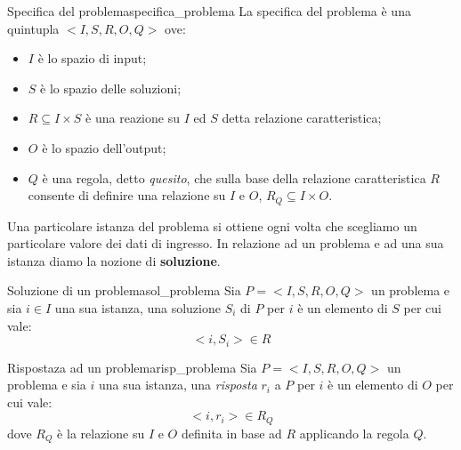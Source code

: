 \documentclass[12pt]{report}
\newcounter{definition}
\newcommand{\nmu}{}
\begin{document}
   	\begin{definition}{\nmu Specifica del problema}{specifica_problema}
   		La specifica del problema è una quintupla $<I, S, R, O, Q>$ ove:
   		\begin{itemize}
   			\item $I$ è lo spazio di input;
   			\item $S$ è lo spazio delle soluzioni;
   			\item $R \subseteq I \times S$ è una reazione su $I$ ed $S$ detta relazione caratteristica;
   			\item $O$ è lo spazio dell'output;
   			\item $Q$ è una regola, detto \textit{quesito}, che sulla base della relazione caratteristica $R$ consente di definire una relazione su $I$ e $O$, $R_Q \subseteq I \times O$.
   		\end{itemize}
   	\end{definition}
   	Una particolare istanza del problema si ottiene ogni volta che scegliamo un particolare valore dei dati di ingresso. In relazione ad un problema e ad una sua istanza diamo la nozione di \textbf{soluzione}.
   	\begin{definition}{\nmu Soluzione di un problema}{sol_problema}
   		Sia $P = <I, S, R, O, Q>$ un problema e sia $i \in I$ una sua istanza, una soluzione $S_i$ di $P$ per $i$ è un elemento di $S$ per cui vale:
   		\[
   		<i, S_i> \in R
   		\]
   	\end{definition}
   	\begin{definition}{\nmu Rispostaza ad un problema}{risp_problema}
   		Sia $P = <I, S, R, O, Q>$ un problema e sia $i$ una sua istanza, una \textit{risposta} $r_i$ a $P$ per $i$ è un elemento di $O$ per cui vale:
   		\[
   		<i, r_i> \in R_Q
   		\]
   		dove $R_Q$ è la relazione su $I$ e $O$ definita in base ad $R$ applicando la regola $Q$.
   	\end{definition}
\end{document}
